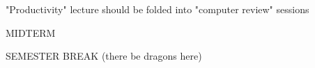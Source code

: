 \documentclass[justified]{tufte-book}
\begin{document}
\frontmatter
	
	


\mainmatter
	
	
	"Productivity" lecture should be folded into "computer review" sessions
	
	
    
	
    
    
    
    
	
    
	
	
    
    
    
    
    
	
	
	
	MIDTERM
	
	
	
	
	
 	
    
	
	
	SEMESTER BREAK (there be dragons here)
	
	
	
	
	
	
	
	
	
	

\appendix
\addappheadtotoc
\appendixpage
	
\end{document}
